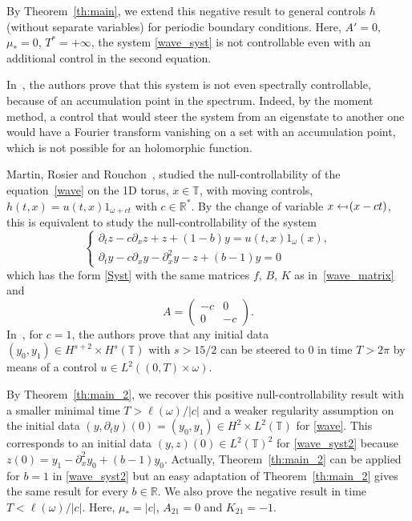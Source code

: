 \documentclass[JEP,XML,SOM,Unicode,NoEqCountersInSection]{cedram}
\def\from{\mathchoice{\longleftarrow}{\leftarrow}{\leftarrow}{\leftarrow}}
\def\mfrom{\mathrel{\from\joinrel\mapstochar}}
\theoremstyle{plain}
\theoremstyle{definition}
\theoremstyle{remark}
\newcommand{\set}{\mathbb}
\newcommand{\R}{} %
\renewcommand{\R}{\set{R}}
\newcommand{\T}{\set{T}}
\begin{document}
By Theorem~\ref{th:main}, we extend this negative result to general controls $h$ (\ie without separate variables) for periodic boundary conditions.
Here, $A'=0$, $\mu_*=0$, $T^\ast=+\infty$, the system \eqref{wave_syst} is not controllable even with an additional control in the second equation.

In~\cite{rosier_2007}, the authors prove that this system is not even spectrally controllable, because of an accumulation point in the spectrum.
Indeed, by the moment method, a control that would steer the system from an eigenstate to another one would have a Fourier transform vanishing on a set with an accumulation point, which is not possible for an holomorphic function.

Martin, Rosier and Rouchon~\cite{martin_2013}, studied the null-controllability of the equation~\eqref{wave} on the 1D torus, $x\in\T$, with moving controls, \ie $h(t,x)=u(t,x) 1_{\omega+ct}$ with $c\in\R^*$.
By the change of variable $x \mfrom (x-ct)$, this is equivalent to study the null-controllability of the system
\begin{equation} \label{wave_syst2}
\begin{cases}
\partial_t z-c\partial_x z+z+(1-b)y= u(t,x) 1_{\omega}(x), \\
\partial_t y-c\partial_x y-\partial_x^2y -z + (b-1)y =0
\end{cases}
\end{equation}
which has the form \eqref{Syst} with the same matrices $f$, $B$, $K$ as in~\eqref{wave_matrix} and
\[
A=\begin{pmatrix}
-c & 0 \\ 0 & -c
\end{pmatrix}.
\]
In~\cite[Th.\,1.2]{martin_2013}, for $c\!=\!1$, the authors prove that any initial data \hbox{$(y_0,y_1)\!\in\! H^{s+2}\!\times\! H^{s}(\T)$} with $s>15/2$ can be steered to $0$ in time $T>2\pi$ by means of a control $u\in L^2((0,T)\times\omega)$.

By Theorem~\ref{th:main_2}, we recover this positive null-controllability result with a smaller minimal time $T>\ell(\omega)/|c|$ and a weaker regularity assumption on the initial data $(y,\partial_t y)(0)=(y_0,y_1)\in H^2 \times L^2(\T)$ for \eqref{wave}.
This corresponds to an initial data $(y,z)(0) \in L^2(\T)^2$ for \eqref{wave_syst2} because $z(0)=y_1-\partial_x^2 y_0 + (b-1)y_0$. Actually, Theorem~\ref{th:main_2} can be applied for $b=1$ in \eqref{wave_syst2} but an easy adaptation of Theorem~\ref{th:main_2} gives the same result for every $b \in \R$.
We also prove the negative result in time $T<\ell(\omega)/|c|$. Here, $\mu_*=|c|$, $A_{21}=0$ and $K_{21}=-1$.
\end{document}
